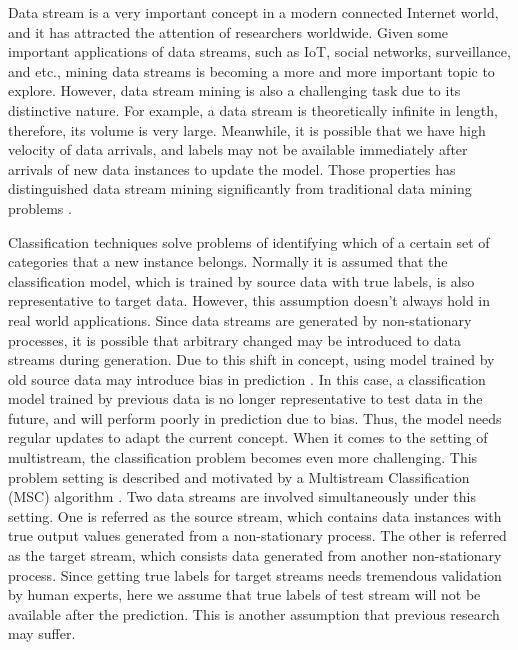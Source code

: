 Data stream is a very important concept in a modern connected Internet 
world, and it has attracted the attention of researchers worldwide. Given some important
applications of data streams, such as IoT, social networks, surveillance, and etc.,
mining data streams is becoming a more and more important topic to explore. 
However, data stream mining is also a challenging task due to its distinctive nature. 
For example, a data stream is theoretically infinite in length, therefore, its volume
is very large. Meanwhile, it is possible that we have high velocity of data arrivals, and labels may not be available immediately after arrivals of new data instances to update the model. 
Those properties has distinguished data 
stream mining significantly from traditional data mining problems \cite{haque2016SAND}.


Classification techniques solve problems of identifying which of a certain set of categories
that a new instance belongs. Normally it is assumed that the classification model, which is
trained by source data with true labels, is also representative to target data.
However, this assumption doesn't always hold in real world applications. Since data streams are generated
by non-stationary processes, it is possible that arbitrary changed may be introduced to data streams during generation. 
Due to this shift in concept, using model trained by old source data may introduce bias
in prediction \cite{herlihy1993methodology}.
In this case, a classification model trained by previous data is no longer representative to test
data in the future, and will perform poorly in prediction due to bias. Thus, the model needs regular updates to adapt the current concept.
When it comes to the setting of multistream, the classification problem becomes even
more challenging. This problem setting is described and motivated by a Multistream
Classification (MSC) algorithm \cite{chandra2016adaptive}. Two data streams are
involved simultaneously under this setting. One is referred as the source stream,
which contains data instances with true output values generated from a non-stationary
process. The other is referred as the target stream, which consists data generated
from another non-stationary process. Since getting true labels for target streams needs tremendous validation by human experts, here
we assume that true labels of test stream will not be available after the prediction. This is another assumption that previous research may suffer. 

